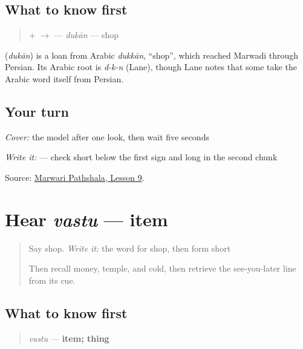 \subsection*{What to know first}
\begin{quote}
\textbf{} + \textbf{} $\to$ \textbf{} — \emph{dukān} — shop
\end{quote}

\begin{cousinweb}
\textbf{} (\emph{dukān}) is a loan from Arabic \emph{dukkān}, \textquotedblleft{}shop\textquotedblright{}, which reached Marwadi through Persian. Its Arabic root is \emph{d-k-n} (Lane), though Lane notes that some take the Arabic word itself from Persian.
\end{cousinweb}

\subsection*{Your turn}
\emph{Cover:} the model after one look, then wait five seconds

\emph{Write it:} \textbf{} — check short \textbf{} below the first sign and long \textbf{} in the second chunk

\begin{tcolorbox}[breakable,colback=teal!4,colframe=teal!35!black,title={Before you move on}]
Source: \href{https://www.marwaripathshala.com/marwari-lesson-9-english}{Marwari Pathshala, Lesson 9}.
\end{tcolorbox}
\section[vastu]{Hear \emph{vastu} — item}

\label{lesson:MW-C13-hear-vastu}



\begin{quote}
Say shop. \emph{Write it:} the word for shop, then form short \textbf{}

Then recall money, temple, and cold, then retrieve the see-you-later line from its cue.
\end{quote}

\subsection*{What to know first}
\begin{quote}
\emph{vastu} — \textbf{item; thing}
\end{quote}


